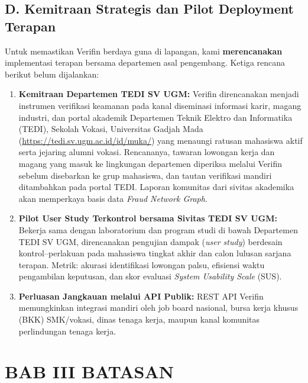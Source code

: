 \documentclass[12pt,a4paper]{article}
\newenvironment{sorotkuning}{%
  \begin{tcolorbox}[
    breakable,
    enhanced,
    frame hidden,
    boxrule=0pt,
    arc=0mm,
    sharp corners,
    colback=yellow!22,
    left=1.5mm, right=1.5mm, top=1.0mm, bottom=1.0mm,
    before skip=1.5pt, after skip=1.5pt
  ]%
}{%
  \end{tcolorbox}%
}
\begin{document}
\subsection*{D. Kemitraan Strategis dan Pilot Deployment Terapan}

\begin{sorotkuning}
Untuk memastikan Verifin berdaya guna di lapangan, kami \textbf{merencanakan} implementasi terapan bersama departemen asal pengembang. Ketiga rencana berikut belum dijalankan:

\begin{enumerate}[label=\textbf{\arabic*.}]
\item \textbf{Kemitraan Departemen TEDI SV UGM:} Verifin direncanakan menjadi instrumen verifikasi keamanan pada kanal diseminasi informasi karir, magang industri, dan portal akademik Departemen Teknik Elektro dan Informatika (TEDI), Sekolah Vokasi, Universitas Gadjah Mada (\url{https://tedi.sv.ugm.ac.id/id/muka/}) yang menaungi ratusan mahasiswa aktif serta jejaring alumni vokasi. Rencananya, tawaran lowongan kerja dan magang yang masuk ke lingkungan departemen diperiksa melalui Verifin sebelum disebarkan ke grup mahasiswa, dan tautan verifikasi mandiri ditambahkan pada portal TEDI. Laporan komunitas dari sivitas akademika akan memperkaya basis data \textit{Fraud Network Graph}.

\item \textbf{Pilot User Study Terkontrol bersama Sivitas TEDI SV UGM:} Bekerja sama dengan laboratorium dan program studi di bawah Departemen TEDI SV UGM, direncanakan pengujian dampak (\textit{user study}) berdesain kontrol--perlakuan pada mahasiswa tingkat akhir dan calon lulusan sarjana terapan. Metrik: akurasi identifikasi lowongan palsu, efisiensi waktu pengambilan keputusan, dan skor evaluasi \textit{System Usability Scale} (SUS).

\item \textbf{Perluasan Jangkauan melalui API Publik:} REST API Verifin memungkinkan integrasi mandiri oleh job board nasional, bursa kerja khusus (BKK) SMK/vokasi, dinas tenaga kerja, maupun kanal komunitas perlindungan tenaga kerja.
\end{enumerate}
\end{sorotkuning}




\section*{BAB III BATASAN}
\end{document}
